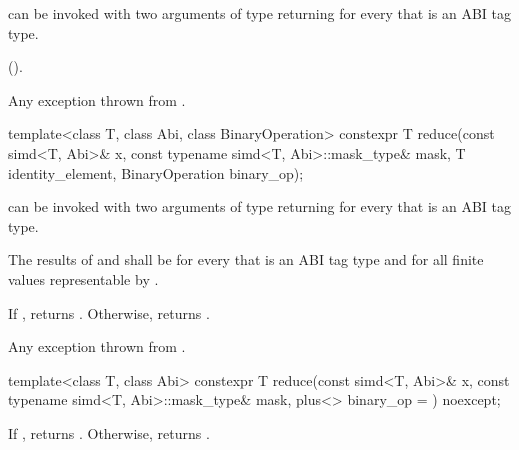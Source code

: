 \begin{itemdescr}
  \pnum\mandates
   can be invoked with two arguments of type  returning  for every  that is an ABI tag type.

  \pnum\returns
   \foralli ().

  \pnum\throws
  Any exception thrown from .
\end{itemdescr}

\begin{itemdecl}
template<class T, class Abi, class BinaryOperation>
  constexpr T reduce(const simd<T, Abi>& x, const typename simd<T, Abi>::mask_type& mask,
                     T identity_element, BinaryOperation binary_op);
\end{itemdecl}

\begin{itemdescr}
  \pnum\mandates
   can be invoked with two arguments of type  returning  for every  that is an ABI tag type.

  \pnum\expects
  The results of  and  shall be  for every  that is an ABI tag type and for all finite values  representable by .

  \pnum\returns
  If , returns .
  Otherwise, returns  \forallmaskedi.

  \pnum\throws
  Any exception thrown from .
\end{itemdescr}

\begin{itemdecl}
template<class T, class Abi>
  constexpr T reduce(const simd<T, Abi>& x, const typename simd<T, Abi>::mask_type& mask,
                     plus<> binary_op = {}) noexcept;
\end{itemdecl}

\begin{itemdescr}
  \pnum\returns
  If , returns . Otherwise, returns  \forallmaskedi.
\end{itemdescr}

